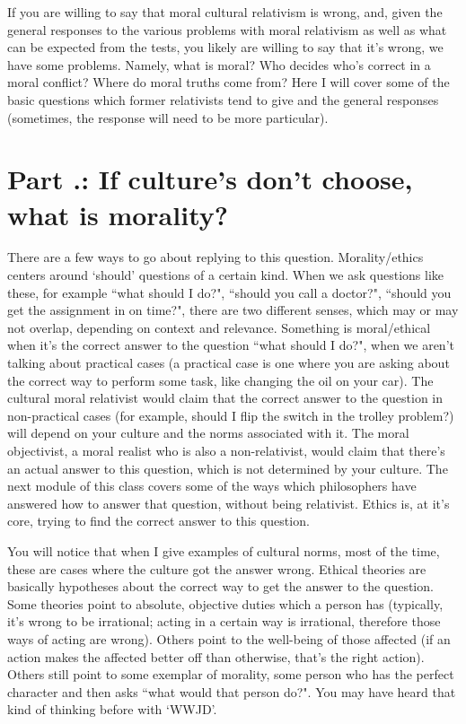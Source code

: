 If you are willing to say that moral cultural relativism is wrong, and, given the general responses to the various problems with moral relativism as well as what can be expected from the tests, you likely are willing to say that it's wrong, we have some problems. Namely, what is moral? Who decides who's correct in a moral conflict? Where do moral truths come from? Here I will cover some of the basic questions which former relativists tend to give and the general responses (sometimes, the response will need to be more particular).

\section{Part \thechapcount.\theseccount: If culture's don't choose, what is morality?}

There are a few ways to go about replying to this question. Morality/ethics centers around `should' questions of a certain kind. When we ask questions like these, for example ``what should I do?", ``should you call a doctor?", ``should you get the assignment in on time?",  there are two different senses, which may or may not overlap, depending on context and relevance. Something is moral/ethical when it's the correct answer to the question ``what should I do?", when we aren't talking about practical cases (a practical case is one where you are asking about the correct way to perform some task, like changing the oil on your car). The cultural moral relativist would claim that the correct answer to the question in non-practical cases (for example, should I flip the switch in the trolley problem?) will depend on your culture and the norms associated with it. The moral objectivist, a moral realist who is also a non-relativist, would claim that there's an actual answer to this question, which is not determined by your culture. The next module of this class covers some of the ways which philosophers have answered how to answer that question, without being relativist. Ethics is, at it's core, trying to find the correct answer to this question.

You will notice that when I give examples of cultural norms, most of the time, these are cases where the culture got the answer wrong. Ethical theories are basically hypotheses about the correct way to get the answer to the question. Some theories point to absolute, objective duties which a person has (typically, it's wrong to be irrational; acting in a certain way is irrational, therefore those ways of acting are wrong). Others point to the well-being of those affected (if an action makes the affected better off than otherwise, that's the right action). Others still point to some exemplar of morality, some person who has the perfect character and then asks ``what would that person do?". You may have heard that kind of thinking before with `WWJD'.  

